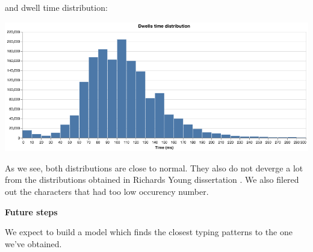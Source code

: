\documentclass[12pt,a4]{article}
\begin{document}
and dwell time distribution:

\begin{center}
	\includegraphics[width=0.85\linewidth]{images/dwells_time.png}
	\label{fig:transitions_time.png}
\end{center}

As we see, both distributions are close to normal. They also do not deverge a lot from the distributions obtained in Richards Young dissertation \cite{richards_young_2018}.
We also filered out the characters that had too low occurency number.

\bigskip
\large\textbf{Future steps}
\bigskip
\normalsize

We expect to build a model which finds the closest typing patterns to the one we've obtained.

{}

\end{document}
